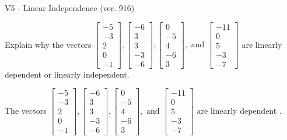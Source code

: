\begin{exercise}
  \begin{exerciseTitle}V5 - Linear Independence (ver. 916)\end{exerciseTitle}
  \begin{exerciseStatement}
    Explain why the vectors \(\left[\begin{array}{r}
-5 \\
-3 \\
2 \\
0 \\
-1
\end{array}\right] , \left[\begin{array}{r}
-6 \\
3 \\
3 \\
-3 \\
-6
\end{array}\right] , \left[\begin{array}{r}
0 \\
-5 \\
4 \\
-6 \\
3
\end{array}\right] , \text{ and } \left[\begin{array}{r}
-11 \\
0 \\
5 \\
-3 \\
-7
\end{array}\right]\) are linearly dependent or linearly independent.	


  \end{exerciseStatement}
  \begin{exerciseAnswer}
   The vectors \(\left[\begin{array}{r}
-5 \\
-3 \\
2 \\
0 \\
-1
\end{array}\right] , \left[\begin{array}{r}
-6 \\
3 \\
3 \\
-3 \\
-6
\end{array}\right] , \left[\begin{array}{r}
0 \\
-5 \\
4 \\
-6 \\
3
\end{array}\right] , \text{ and } \left[\begin{array}{r}
-11 \\
0 \\
5 \\
-3 \\
-7
\end{array}\right]\) are 
  	 linearly dependent  .
  


  \end{exerciseAnswer}
\end{exercise}